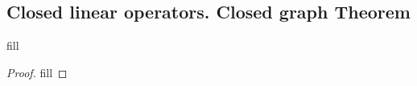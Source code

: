 \subsection{Closed linear operators. Closed graph Theorem}

\begin{exercise}{1}
fill
\end{exercise}
\begin{proof}
fill
\end{proof}